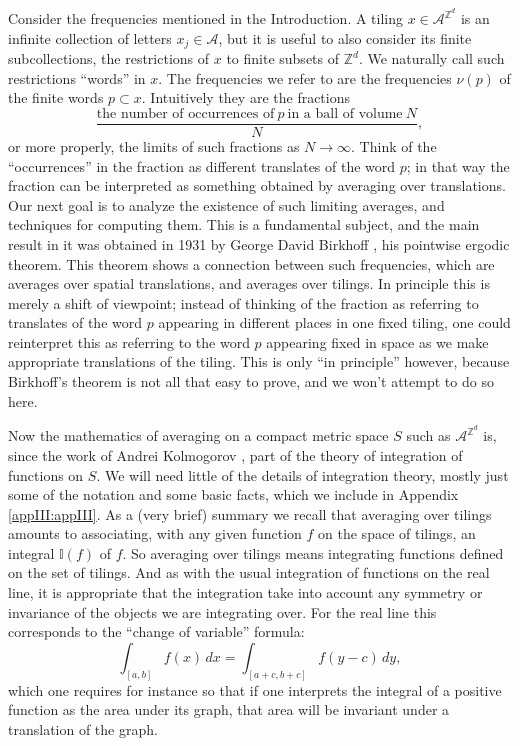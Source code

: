 \documentclass[reqno]{stml-l}
\theoremstyle{plain}
\theoremstyle{definition}
\numberwithin{equation}{chapter}
\begin{document}
Consider the frequencies mentioned in the Introduction. A
tiling $x\in \mathcal{A}^{\mathbb{Z}^{d}}$ is an infinite
collection of letters $x_{j}\in \mathcal{A}$, but it is
useful to also consider its finite subcollections, the
restrictions of $x$ to finite subsets of $\mathbb{Z}^{d}$.
We naturally call such restrictions ``words'' in $x$. The
frequencies we refer to are the frequencies $\nu(p)$ of the
finite words $p\subset x$. Intuitively they are the
fractions
\begin{equation}\label{ch01:eqn1.5}
\frac{\text{the number of occurrences of}\ p\ \text{in a ball of volume}\
N}{N},
\end{equation}
or more properly, the limits of such fractions as
$N\rightarrow\infty$. Think of the ``occurrences'' in the
fraction as different translates of the word $p$; in that
way the fraction can be interpreted as something obtained
by averaging over translations. Our next goal is to analyze
the existence of such limiting averages, and techniques for
computing them. This is a fundamental subject, and the main
result in it was obtained in 1931 by George David Birkhoff
\cite[p. 34]{bib:Wal}, his pointwise ergodic theorem.
This theorem shows a connection between such frequencies,
which are averages over spatial translations, and averages
over tilings. In principle this is merely a shift of
viewpoint; instead of thinking of the fraction as referring
to translates of the word $p$ appearing in different places
in one fixed tiling, one could reinterpret this as
referring to the word $p$ appearing fixed in space as we
make appropriate translations of the tiling. This is only
``in principle'' however, because Birkhoff's theorem is not
all that easy to prove, and we won't attempt to do so here.

Now the mathematics of averaging on a compact metric space
$S$ such as $\mathcal{A}^{\mathbb{Z}^{d}}$ is, since the
work of Andrei Kolmogorov \cite{bib:Kol}, part of the
theory of integration of functions on $S$. We will need
little of the details of integration theory, mostly just
some of the notation and some basic facts, which we include
in Appendix \ref{appIII:appIII}. As a (very brief) summary we recall that
averaging over tilings amounts to associating, with any
given function $f$ on the space of tilings, an integral
$\mathbb{I}(f)$ of $f$. So averaging over tilings means
integrating functions defined on the set of tilings. And as
with the usual integration of functions on the real line,
it is appropriate that the integration take into account
any symmetry or invariance of the objects we are
integrating over. For the real line this corresponds to the
``change of variable'' formula:
\begin{equation}\label{ch01:eqn1.6}
\int_{[a,b]}f(x)\,dx=\int_{[a+c,b+c]}f(y-c)\,dy,
\end{equation}
which one requires for instance so that if one interprets
the integral of a positive function as the area under its
graph, that area will be invariant under a translation of
the graph.
\end{document}
